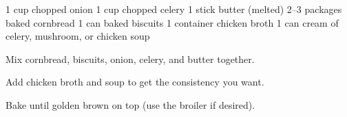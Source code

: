 \dishtype{\side}
\dishtype{\vegetarian}
\begin{ingreds}
    1 cup chopped onion
    1 cup chopped celery
    1 stick butter (melted)
    2--3 packages baked cornbread
    1 can baked biscuits
    1 container chicken broth
    1 can cream of celery, mushroom, or chicken soup 
\end{ingreds}
\begin{method}
    Mix cornbread, biscuits, onion, celery, and butter together.\par
    Add chicken broth and soup to get the consistency you want.\par
    Bake until golden brown on top (use the broiler if desired).
\end{method}